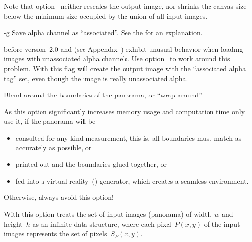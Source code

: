 \begin{codelist}
  Note that option~ neither rescales the output image, nor
  shrinks the canvas size below the minimum size occupied by the union
  of all input images.


  \label{opt:g}%
\item[-g] Save alpha channel as ``associated''.
  See the  for an explanation.

   before version~2.0 and
   (see
  Appendix~) exhibit unusual behavior
  when loading images with unassociated alpha channels.  Use
  option~ to work around this problem.  With this flag
  \App{} will create the output image with the ``associated alpha
  tag'' set, even though the image is really unassociated alpha.


  \label{opt:wrap}%
\item[\itempar{-w \optional{\metavar{MODE}} \\ --wrap\optional{=\metavar{MODE}}}]\itemend
  Blend around the boundaries of the panorama, or ``wrap
  around''.

  As this option significantly increases memory usage and computation
  time only use it, if the panorama will be

  \begin{itemize}
  \item
    consulted for any kind measurement, this is, all boundaries must match
    as accurately as possible, or

  \item
    printed out and the boundaries glued together, or

  \item
    fed into a virtual reality~()%
     generator, which creates
    a seamless environment.
  \end{itemize}

  \noindent Otherwise, always avoid this option!

  With this option \App{} treats the set of input images (panorama) of
  width~$w$ and height~$h$ as an infinite data structure, where each
  pixel~$P(x, y)$ of the input images represents the set of
  pixels~$S_P(x, y)$.\footnotemark


\end{codelist}
